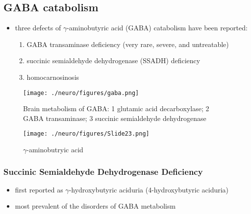 \documentclass{scrartcl}
\begin{document}
\subsection{GABA catabolism}
\label{sec:orgeb58854}
\begin{itemize}
\item three defects of \(\gamma\)-aminobutyric acid (GABA) catabolism have been reported:
\begin{enumerate}
\item GABA transaminase deficiency (very rare, severe, and untreatable)
\item succinic semialdehyde dehydrogenase (SSADH) deficiency
\item homocarnosinosis
\end{enumerate}
\end{itemize}

\begin{figure}[htbp]
\centering
\texttt{[image: ./neuro/figures/gaba.png]}
\caption{\label{fig:orge75ba05}
Brain metabolism of GABA: 1 glutamic acid decarboxylase; 2 GABA transaminase; 3 succinic semialdehyde dehydrogenase}
\end{figure}

\begin{figure}[htbp]
\centering
\texttt{[image: ./neuro/figures/Slide23.png]}
\caption{\label{fig:orgac64f25}
\(\gamma\)-aminobutryic acid}
\end{figure}

\subsubsection{Succinic Semialdehyde Dehydrogenase Deficiency}
\label{sec:orgc0f69a5}
\begin{itemize}
\item first reported as \(\gamma\)-hydroxybutyric aciduria (4-hydroxybutyric
aciduria)
\item most prevalent of the disorders of GABA metabolism
\end{itemize}
\end{document}
